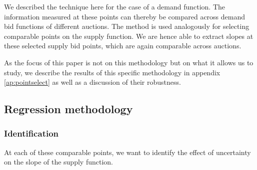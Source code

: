 
We described the technique here for the case of a demand function. The information measured at these points can thereby be compared across demand bid functions of different auctions. The method is used analogously for selecting comparable points on the supply function. We are hence able to extract slopes at these selected supply bid points, which are again comparable across auctions.

As the focus of this paper is not on this methodology but on what it allows us to study, we describe the results of this specific methodology in appendix \ref{ap:pointselect} as well as a discussion of their robustness.



\subsection{Regression methodology}
\subsubsection{Identification}
\label{identification}
At each of these comparable points, %
we want to identify the effect of uncertainty on the slope of the supply function. %


